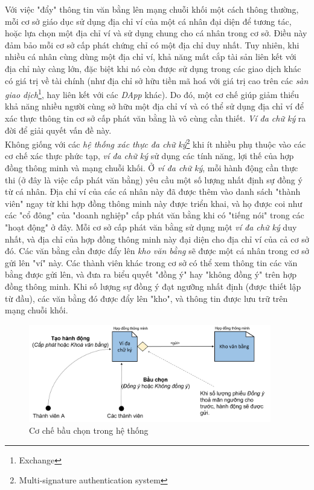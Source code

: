 Với việc "đẩy" thông tin văn bằng lên mạng chuỗi khối một cách thông thường, mỗi cơ sở giáo dục sử dụng địa chỉ ví của một cá nhân đại diện để tương tác, hoặc lựa chọn một địa chỉ ví và sử dụng chung cho cá nhân trong cơ sở. Điều này đảm bảo mỗi cơ sở cấp phát chứng chỉ có một địa chỉ duy nhất. Tuy nhiên, khi nhiều cá nhân cùng dùng một địa chỉ ví, khả năng mất cắp tài sản liên kết với địa chỉ này càng lớn, đặc biệt khi nó còn được sử dụng trong các giao dịch khác có giá trị về tài chính (như địa chỉ sở hữu tiền mã hoá với giá trị cao trên các \textit{sàn giao dịch}\footnote{Exchange}, hay liên kết với các \textit{DApp} khác). Do đó, một cơ chế giúp giảm thiểu khả năng nhiều người cùng sở hữu một địa chỉ ví và có thể sử dụng địa chỉ ví để xác thực thông tin cơ sở cấp phát văn bằng là vô cùng cần thiết. \textit{Ví đa chữ ký} ra đời để giải quyết vấn đề này.\\

Không giống với các \textit{hệ thống xác thực đa chữ ký}\footnote{Multi-signature authentication system} khi ít nhiều phụ thuộc vào các cơ chế xác thực phức tạp, \textit{ví đa chữ ký} sử dụng các tính năng, lợi thế của hợp đồng thông minh và mạng chuỗi khối. Ở \textit{ví đa chữ ký}, mỗi hành động cần thực thi (ở đây là việc cấp phát văn bằng) yêu cầu một số lượng nhất định sự đồng ý từ cá nhân. Địa chỉ ví của các cá nhân này đã được thêm vào danh sách "thành viên" ngay từ khi hợp đồng thông minh này được triển khai, và họ được coi như các "cổ đông" của "doanh nghiệp" cấp phát văn bằng khi có "tiếng nói" trong các "hoạt động" ở đây. Mỗi cơ sở cấp phát văn bằng sử dụng một \textit{ví đa chữ ký} duy nhất, và địa chỉ của hợp đồng thông minh này đại diện cho địa chỉ ví của cả cơ sở đó. Các văn bằng cần được đẩy lên \textit{kho văn bằng} sẽ được một cá nhân trong cơ sở gửi lên "ví" này. Các thành viên khác trong cơ sở có thể xem thông tin các văn bằng được gửi lên, và đưa ra biểu quyết "đồng ý" hay "không đồng ý" trên hợp đồng thông minh. Khi số lượng sự đồng ý đạt ngưỡng nhất định (được thiết lập từ đầu), các văn bằng đó được đẩy lên "kho", và thông tin được lưu trữ trên mạng chuỗi khối.\\

\begin{figure}[!ht]
    \centering
    \includegraphics[width=400px]{anh/giai-phap/co-che-bau-chon.png}
    \caption{Cơ chế bầu chọn trong hệ thống}
\end{figure}


